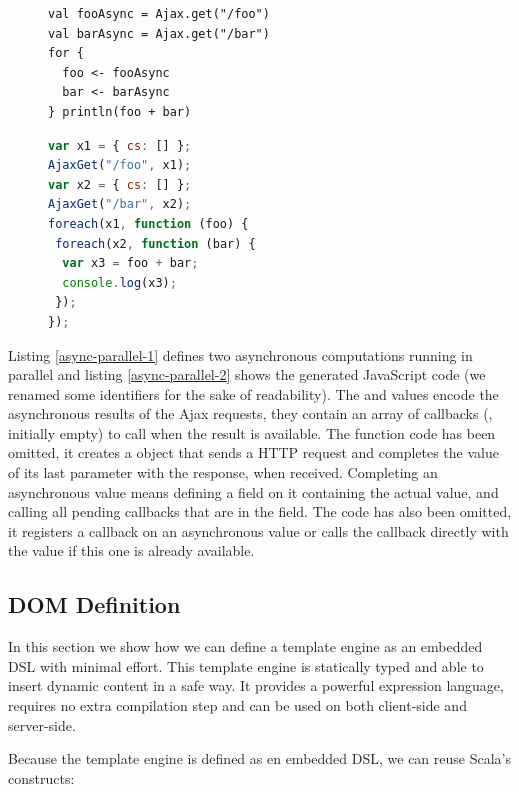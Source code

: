 \documentclass[american,english,runningheads]{llncs}
\begin{document}
\begin{figure}
\begin{multicols}{2}
\begin{lstlisting}[caption=Parallel computations in Scala,label=async-parallel-1]
val fooAsync = Ajax.get("/foo")
val barAsync = Ajax.get("/bar")
for {
  foo <- fooAsync
  bar <- barAsync
} println(foo + bar)
\end{lstlisting}
\vfill
\columnbreak
\begin{lstlisting}[language=JavaScript,caption=Generated JavaScript code,label=async-parallel-2]
var x1 = { cs: [] };
AjaxGet("/foo", x1);
var x2 = { cs: [] };
AjaxGet("/bar", x2);
foreach(x1, function (foo) {
 foreach(x2, function (bar) {
  var x3 = foo + bar;
  console.log(x3);
 });
});
\end{lstlisting}
\end{multicols}
\end{figure}

Listing \ref{async-parallel-1} defines two asynchronous computations running in parallel and listing
\ref{async-parallel-2} shows the generated JavaScript code (we renamed some identifiers for the sake of readability).
The  and  values encode the asynchronous results of the Ajax requests, they contain an array of
callbacks (, initially empty) to call when the result is available. The  function code has
been omitted, it creates a  object that sends a HTTP request and completes the value of its
last parameter with the response, when received. Completing an asynchronous value means defining a  field
on it containing the actual value, and calling all pending callbacks that are in the  field. The
 code has also been omitted, it registers a callback on an asynchronous value or calls the callback
directly with the value if this one is already available.

\subsection{DOM Definition}

In this section we show how we can define a template engine as an embedded DSL with minimal effort. This template
engine is statically typed and able to insert dynamic content in a safe way. It provides a powerful expression
language, requires no extra compilation step and can be used on both client-side and server-side.

Because the template engine is defined as en embedded DSL, we can reuse Scala’s constructs:
\end{document}
